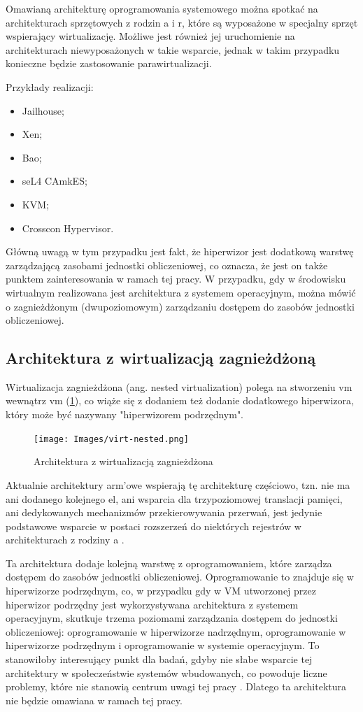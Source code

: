 \documentclass[../../main]{subfiles}
\begin{document}
Omawianą architekturę oprogramowania systemowego można spotkać na architekturach sprzętowych z rodzin \gls{a} i \gls{r}, które są wyposażone w specjalny sprzęt wspierający wirtualizację. Możliwe jest również jej uruchomienie na architekturach niewyposażonych w takie wsparcie, jednak w takim przypadku konieczne będzie zastosowanie parawirtualizacji.

Przykłady realizacji:
\begin{itemize}
    \item Jailhouse;
    \item Xen;
    \item Bao;
    \item seL4 CAmkES;
    \item KVM;
    \item Crosscon Hypervisor.
\end{itemize}

Główną uwagą w tym przypadku jest fakt, że hiperwizor jest dodatkową warstwę zarządzającą zasobami jednostki obliczeniowej, co oznacza, że jest on także punktem zainteresowania w ramach tej pracy. W przypadku, gdy w środowisku wirtualnym realizowana jest architektura z systemem operacyjnym, można mówić o zagnieżdżonym (dwupoziomowym) zarządzaniu dostępem do zasobów jednostki obliczeniowej.

\subsection{Architektura z wirtualizacją zagnieżdżoną}

Wirtualizacja zagnieżdżona (ang. nested virtualization) polega na stworzeniu \gls{vm} wewnątrz \gls{vm} (\cref{fig:virt-nested}), co wiąże się z dodaniem też dodanie dodatkowego hiperwizora, który może być nazywany "hiperwizorem podrzędnym".

\begin{figure}[h]
    \centering
    \texttt{[image: Images/virt-nested.png]}
    \caption{Architektura z wirtualizacją zagnieżdżona}
    \label{fig:virt-nested}
\end{figure}

Aktualnie architektury \gls{arm}'owe wspierają tę architekturę częściowo, tzn. nie ma ani dodanego kolejnego \gls{el}, ani wsparcia dla trzypoziomowej translacji pamięci, ani dedykowanych  mechanizmów przekierowywania przerwań, jest jedynie podstawowe wsparcie w postaci rozszerzeń do niektórych rejestrów w architekturach z rodziny \gls{a} \cite{nestvirtarm}.

Ta architektura dodaje kolejną warstwę z oprogramowaniem, które zarządza dostępem do zasobów jednostki obliczeniowej. Oprogramowanie to znajduje się w hiperwizorze podrzędnym, co, w przypadku gdy w VM utworzonej przez hiperwizor podrzędny jest wykorzystywana architektura z systemem operacyjnym, skutkuje trzema poziomami zarządzania dostępem do jednostki obliczeniowej: oprogramowanie w hiperwizorze nadrzędnym, oprogramowanie w hiperwizorze podrzędnym i oprogramowanie w systemie operacyjnym. To stanowiłoby interesujący punkt dla badań, gdyby nie słabe wsparcie tej architektury w społeczeństwie systemów wbudowanych, co powoduje liczne problemy, które nie stanowią centrum uwagi tej pracy \cite{nestvirtarm}. Dlatego ta architektura nie będzie omawiana w ramach tej pracy.
\end{document}
